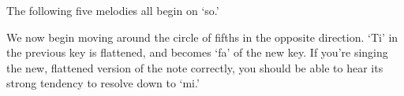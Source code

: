\documentclass{sight}
\begin{document}
\pagebreak[3]\par
\vspace{5mm}\begin{samepage}
%
\label{tune:37}%
{%
\parindent 0pt
\noindent
\ifx\preLilyPondExample \undefined
\else
  \expandafter\preLilyPondExample
\fi
\def\lilypondbook{}%

\ifx\postLilyPondExample \undefined
\else
  \expandafter\postLilyPondExample
\fi
}
\end{samepage}


\pagebreak[3]\par
\vspace{5mm}\begin{samepage}The following five melodies all begin on `so.'\\


\pagebreak[3]\par
\par
{}
%
\label{tune:38}%
{%
\parindent 0pt
\noindent
\ifx\preLilyPondExample \undefined
\else
  \expandafter\preLilyPondExample
\fi
\def\lilypondbook{}%

\ifx\postLilyPondExample \undefined
\else
  \expandafter\postLilyPondExample
\fi
}
\end{samepage}


\pagebreak[3]\par
\vspace{5mm}\begin{samepage}We now begin moving around the circle of fifths in the opposite direction. `Ti' in the previous key is flattened, and becomes `fa' of the new key. If you're singing the new, flattened version of the note correctly, you should be able to hear its strong tendency to resolve down to `mi.'\\


\pagebreak[3]\par
{}%
\label{tune:39}%
{%
\parindent 0pt
\noindent
\ifx\preLilyPondExample \undefined
\else
  \expandafter\preLilyPondExample
\fi
\def\lilypondbook{}%

\ifx\postLilyPondExample \undefined
\else
  \expandafter\postLilyPondExample
\fi
}
\end{samepage}
\end{document}

